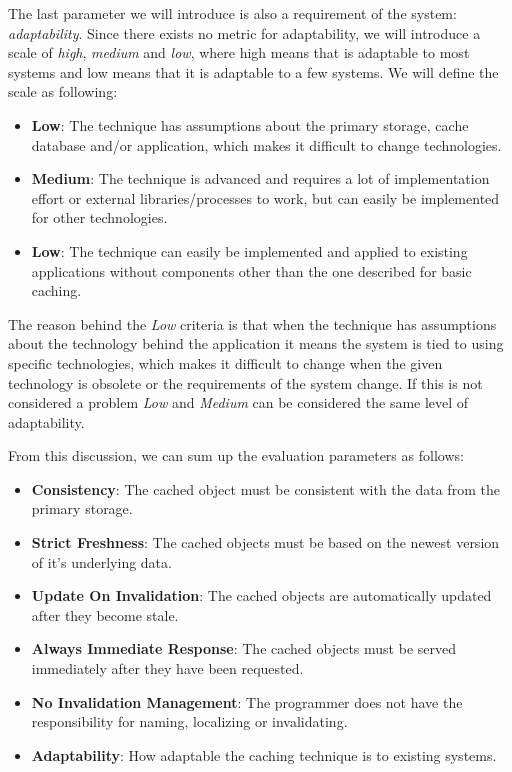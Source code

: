 
The last parameter we will introduce is also a requirement of the system: \emph{adaptability}. Since there exists no metric for adaptability, we will introduce a scale of \emph{high}, \emph{medium} and \emph{low}, where high means that is adaptable to most systems and low means that it is adaptable to a few systems. We will define the scale as following:

\begin{itemize}
  \item \textbf{Low}: The technique has assumptions about the primary storage, cache database and/or application, which makes it difficult to change technologies.
  \item \textbf{Medium}: The technique is advanced and requires a lot of implementation effort or external libraries/processes to work, but can easily be implemented for other technologies.
  \item \textbf{Low}: The technique can easily be implemented and applied to existing applications without components other than the one described for basic caching.
\end{itemize}

The reason behind the \emph{Low} criteria is that when the technique has assumptions about the technology behind the application it means the system is tied to using specific technologies, which makes it difficult to change when the given technology is obsolete or the requirements of the system change. If this is not considered a problem \emph{Low} and \emph{Medium} can be considered the same level of adaptability.

From this discussion, we can sum up the evaluation parameters as follows:

\begin{itemize}
  \item \textbf{Consistency}: The cached object must be consistent with the data from the primary storage.
  \item \textbf{Strict Freshness}: The cached objects must be based on the newest version of it's underlying data.
  \item \textbf{Update On Invalidation}: The cached objects are automatically updated after they become stale.
  \item \textbf{Always Immediate Response}: The cached objects must be served immediately after they have been requested.
  \item \textbf{No Invalidation Management}: The programmer does not have the responsibility for naming, localizing or invalidating.
  \item \textbf{Adaptability}: How adaptable the caching technique is to existing systems.
\end{itemize}


